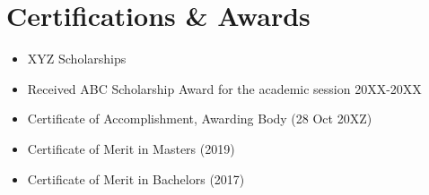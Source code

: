 \documentclass[11pt]{article}
\begin{document}
    \section{Certifications \& Awards}
    \begin{itemize}
        \item[\checkmark] XYZ Scholarships
        \item[\checkmark] Received ABC Scholarship Award for the academic session 20XX-20XX
        \item[\checkmark] Certificate of Accomplishment, Awarding Body (28 Oct 20XZ)
        \item[\checkmark] Certificate of Merit in Masters (2019)
        \item[\checkmark] Certificate of Merit in Bachelors (2017)
    \end{itemize}
    
\end{document}
